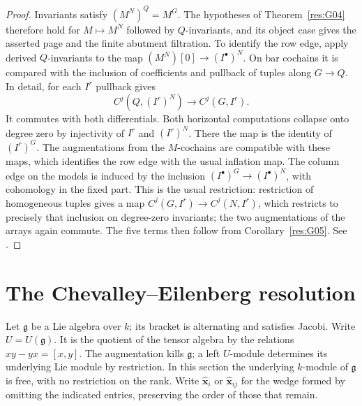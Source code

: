 \begin{proof}
Invariants satisfy \((M^N)^Q=M^G\). The hypotheses of
Theorem~\ref{res:G04} therefore hold for \(M\mapsto M^N\) followed
by \(Q\)-invariants, and its object case gives the asserted page
and the finite abutment filtration. To identify the row edge,
apply derived \(Q\)-invariants to the map
\((M^N)[0]\to (I^\bullet)^N\). On bar cochains it is compared
with the inclusion of coefficients and pullback of tuples along
\(G\to Q\). In detail, for each \(I^r\) pullback gives
\[
 C^j(Q,(I^r)^N)\longrightarrow C^j(G,I^r).
\]
It commutes with both differentials. Both horizontal computations
collapse onto degree zero by injectivity of \(I^r\) and \((I^r)^N\).
There the map is the identity of \((I^r)^G\). The augmentations
from the \(M\)-cochains are compatible with these maps, which
identifies the row edge with the usual inflation map. The column
edge on the models is induced by the inclusion
\((I^\bullet)^G\to (I^\bullet)^N\), with cohomology in the fixed
part. This is the usual restriction: restriction of homogeneous
tuples gives a map \(C^j(G,I^r)\to C^j(N,I^r)\), which restricts
to precisely that inclusion on degree-zero invariants; the two
augmentations of the arrays again commute. The five terms then
follow from Corollary~\ref{res:G05}. See \cite[Section 6.8]{weibel}.
\end{proof}

\section{The Chevalley--Eilenberg resolution}

Let \(\mathfrak g\) be a Lie algebra over \(k\); its bracket is
alternating and satisfies Jacobi. Write \(U=U(\mathfrak g)\).
It is the quotient of the tensor algebra by the relations
\(xy-yx=[x,y]\). The augmentation kills \(\mathfrak g\); a left
\(U\)-module determines its underlying Lie module by restriction.
In this section the underlying \(k\)-module of \(\mathfrak g\) is
free, with no restriction on the rank. Write
\(\widehat{\boldsymbol x}_i\) or \(\widehat{\boldsymbol x}_{ij}\)
for the wedge formed by omitting the indicated entries, preserving
the order of those that remain.

